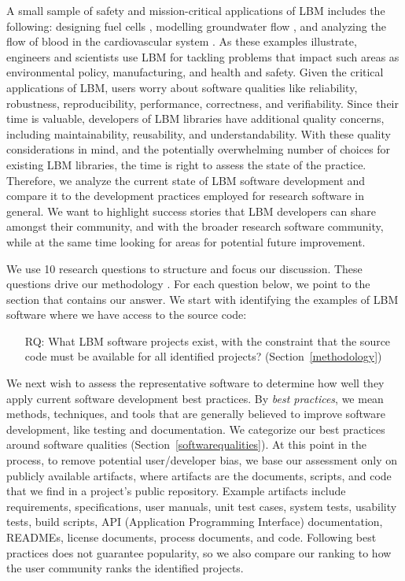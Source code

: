\documentclass[final, 3p, times, authoryear]{elsarticle}
\newcounter{rqnum} %
\begin{document}
A small sample of safety and mission-critical applications of LBM includes the
following: designing fuel cells \citep{ZhangEtAl2018}, modelling groundwater
flow \citep{AnwarAndSukop2009}, and analyzing the flow of blood in the
cardiovascular system \citep{SadeghiEtAl2022b, SadeghiEtAl2022,
SadeghiEtAl2020}.  As these examples illustrate, engineers and scientists use
LBM for tackling problems that impact such areas as environmental policy,
manufacturing, and health and safety. Given the critical applications of LBM,
users worry about software qualities like reliability, robustness,
reproducibility, performance, correctness, and verifiability.  Since their time
is valuable, developers of LBM libraries have additional quality concerns,
including maintainability, reusability, and understandability.  With these
quality considerations in mind, and the potentially overwhelming number of
choices for existing LBM libraries, the time is right to assess the state of the
practice. Therefore, we analyze the current state of LBM software development
and compare it to the development practices employed for research software in
general.  We want to highlight success stories that LBM developers can share
amongst their community, and with the broader research software community, while
at the same time looking for areas for potential future improvement.

We use 10 research questions to structure and focus our discussion. These
questions drive our methodology \citep{SmithEtAl2021, SmithAndMichalski2022}.
For each question below, we point to the section that contains our answer.  We
start with identifying the examples of LBM software where we have access to the
source code:

\begin{enumerate}
	\item[RQ\refstepcounter{rqnum}\therqnum \label{RQ_WhatProjects}:] What LBM
	software projects exist, with the constraint that the source code must be
	available for all identified projects? (Section~\ref{methodology})
\end{enumerate}

We next wish to assess the representative software to determine how well they
apply current software development best practices.  By \emph{best practices}, we
mean methods, techniques, and tools that are generally believed to improve
software development, like testing and documentation.  We categorize our best
practices around software qualities (Section~\ref{softwarequalities}).  At this
point in the process, to remove potential user/developer bias, we base our
assessment only on publicly available artifacts, where artifacts are the
documents, scripts, and code that we find in a project's public repository.
Example artifacts include requirements, specifications, user manuals, unit test
cases, system tests, usability tests, build scripts, API (Application
Programming Interface) documentation, READMEs, license documents, process
documents, and code. Following best practices does not guarantee popularity, so
we also compare our ranking to how the user community ranks the identified
projects.
\end{document}
